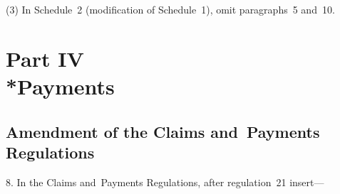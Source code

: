\documentclass[12pt,a4paper]{article}
\begin{document}
(3) In Schedule~2 (modification of Schedule~1), omit paragraphs~5 and~10.

\section[Part IV --- Payments]{Part IV\\*Payments}

\renewcommand\parthead{--- Part IV}

\subsection[8. Amendment of the Claims and~Payments Regulations]{Amendment of the Claims and~Payments Regulations}

8.  In the Claims and~Payments Regulations, after regulation~21 insert—
\end{document}
